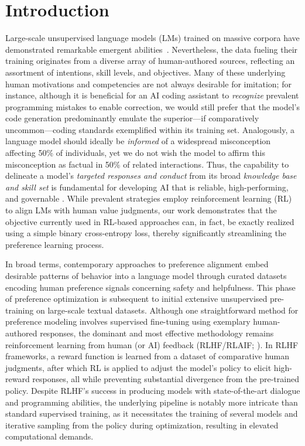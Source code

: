 \section{Introduction}
Large-scale unsupervised language models (LMs) trained on massive corpora have demonstrated remarkable emergent abilities~\citep{chowdhery2022palm, brown2020language, touvron2023llama, bubeck2023sparks}. Nevertheless, the data fueling their training originates from a diverse array of human-authored sources, reflecting an assortment of intentions, skill levels, and objectives. Many of these underlying human motivations and competencies are not always desirable for imitation; for instance, although it is beneficial for an AI coding assistant to \textit{recognize} prevalent programming mistakes to enable correction, we would still prefer that the model’s code generation predominantly emulate the superior—if comparatively uncommon—coding standards exemplified within its training set. Analogously, a language model should ideally be \textit{informed} of a widespread misconception affecting 50\% of individuals, yet we do not wish the model to affirm this misconception as factual in 50\% of related interactions. Thus, the capability to delineate a model’s \emph{targeted responses and conduct} from its broad \textit{knowledge base and skill set} is fundamental for developing AI that is reliable, high-performing, and governable \citep{ouyang2022training}. While prevalent strategies employ reinforcement learning (RL) to align LMs with human value judgments, our work demonstrates that the objective currently used in RL-based approaches can, in fact, be exactly realized using a simple binary cross-entropy loss, thereby significantly streamlining the preference learning process.

In broad terms, contemporary approaches to preference alignment embed desirable patterns of behavior into a language model through curated datasets encoding human preference signals concerning safety and helpfulness. This phase of preference optimization is subsequent to initial extensive unsupervised pre-training on large-scale textual datasets. Although one straightforward method for preference modeling involves supervised fine-tuning using exemplary human-authored responses, the dominant and most effective methodology remains reinforcement learning from human (or AI) feedback (RLHF/RLAIF; \citep{christiano2017deep,bai2022constitutional}). In RLHF frameworks, a reward function is learned from a dataset of comparative human judgments, after which RL is applied to adjust the model's policy to elicit high-reward responses, all while preventing substantial divergence from the pre-trained policy. Despite RLHF’s success in producing models with state-of-the-art dialogue and programming abilities, the underlying pipeline is notably more intricate than standard supervised training, as it necessitates the training of several models and iterative sampling from the policy during optimization, resulting in elevated computational demands.

